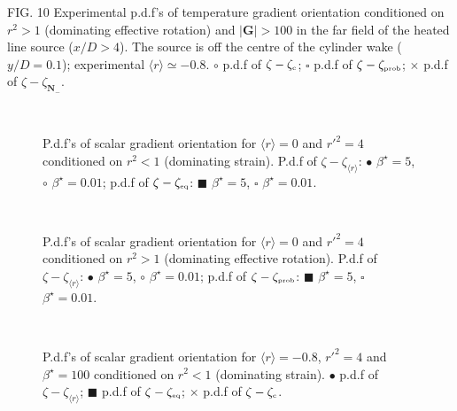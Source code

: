 \documentclass[doublespacing]{elsart}
\begin{document}
\bigskip

\noindent
FIG. 10
Experimental
p.d.f's of temperature gradient orientation
conditioned on $ r^2 > 1 $ (dominating effective rotation)
and $ |\bm{G}| > 100 $ in the far field of
the heated line source ($ x/D > 4 $).
The
source is off the centre of the cylinder wake
($ y/D = 0.1 $);
experimental $ \langle r \rangle \simeq -0.8 $.
$ \circ $ p.d.f of $ \zeta - \zeta_{\mbox{\tiny c}} $;
$ \square $ p.d.f of $ \zeta - \zeta_{\mbox{\tiny prob}} $;
$ \times $ p.d.f of $ \zeta - \zeta_{\bm{N}_-} $. 

\newpage

\begin{figure}[htpb]
\begin{center}
\\
\caption{\label{fig1}
P.d.f's of scalar gradient orientation for
$ \langle r \rangle = 0 $ and $ r'^2 = 4 $
conditioned on $ r^2 < 1 $
(dominating strain).
P.d.f of $ \zeta - \zeta_{\langle r \rangle}$:
$ \bullet $
$ \beta^{\star} = 5 $,
$ \circ $
$ \beta^{\star} = 0.01 $;
p.d.f of $ \zeta - \zeta_{\mbox{\tiny eq}}$:
$ \blacksquare $
$ \beta^{\star} = 5 $,
$ \square $
$ \beta^{\star} = 0.01 $.}
\end{center}
\end{figure}

\newpage

\begin{figure}[htpb]
\begin{center}
\\
\caption{\label{fig2}
P.d.f's of scalar gradient orientation for
$ \langle r \rangle = 0 $ and $ r'^2 = 4 $
conditioned on $ r^2 > 1 $
(dominating effective rotation).
P.d.f of $ \zeta - \zeta_{\langle r \rangle}$:
$ \bullet $
$ \beta^{\star} = 5 $,
$ \circ $
$ \beta^{\star} = 0.01 $;
p.d.f of $ \zeta - \zeta_{\mbox{\tiny prob}}$:
$ \blacksquare $
$ \beta^{\star} = 5 $,
$ \square $
$ \beta^{\star} = 0.01 $.}
\end{center}
\end{figure}

\newpage

\begin{figure}[htpb]
\begin{center}
\\
\caption{\label{fig3}
P.d.f's of scalar gradient orientation for
$ \langle r \rangle = -0.8 $, $ r'^2 = 4 $
and $ \beta^{\star} = 100 $
conditioned on $ r^2 < 1 $ (dominating strain).
$ \bullet $ p.d.f of $ \zeta - \zeta_{\langle r \rangle} $;
$ \blacksquare $ p.d.f of $ \zeta - \zeta_{\mbox{\tiny eq}} $;
$ \times $ p.d.f of $ \zeta - \zeta_{\mbox{\tiny c}} $.}
\end{center}
\end{figure}
\end{document}
